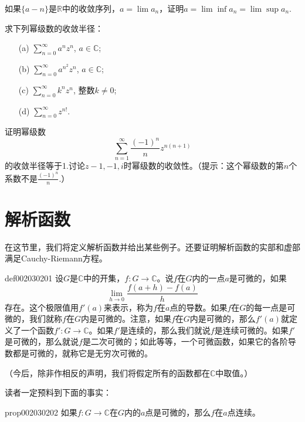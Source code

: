 \begin{exercise}
如果$\{a-n\}$是$\mathbb{R}$中的收敛序列，$a = \lim{a_n}$，证明$a = \lim\inf{a_n} = \lim\sup{a_n}$.
\end{exercise}

\begin{exercise}
求下列幂级数的收敛半径：
\begin{enumerate}
\item[(a)]$\sum\limits_{n=0}^{\infty}{a^nz^n}$, $a \in \mathbb{C}$;
\item[(b)]$\sum\limits_{n=0}^{\infty}{a^{n^2}z^n}$, $a \in \mathbb{C}$;
\item[(c)]$\sum\limits_{n=0}^{\infty}{k^nz^n}$, 整数$k \neq 0$;
\item[(d)]$\sum\limits_{n=0}^{\infty}{z^{n!}}$.
\end{enumerate}
\end{exercise}

\begin{exercise}
证明幂级数
\[
\sum_{n=1}^{\infty}{\frac{(-1)^n}{n}z^{n(n+1)}}
\]
的收敛半径等于1.讨论$z-1,-1, i$时幂级数的收敛性。（提示：这个幂级数的第$n$个系数不是$\frac{(-1)^n}{n}$.）
\end{exercise}

\section{解析函数}\label{section0020302}
在这节里，我们将定义解析函数并给出某些例子。还要证明解析函数的实部和虚部满足Cauchy-Riemann方程。

\begin{definition}{}{def002030201}
设$G$是$\mathbb{C}$中的开集，$f: G \to \mathbb{C}$。说$f$在$G$内的一点$a$是可微的，如果
\[
\lim_{h \to 0}{\frac{f(a+h) - f(a)}{h}}
\]
存在。这个极限值用$f'(a)$来表示，称为$f$在$a$点的导数。如果$f$在$G$的每一点是可微的，我们就称$f$在$G$内是可微的。注意，如果$f$在$G$内是可微的，那么$f'(a)$就定义了一个函数$f':G \to \mathbb{C}$。如果$f'$是连续的，那么我们就说$f$是连续可微的。如果$f'$是可微的，那么就说$f$是二次可微的；如此等等，一个可微函数，如果它的各阶导数都是可微的，就称它是无穷次可微的。
\end{definition}

（今后，除非作相反的声明，我们将假定所有的函数都在$\mathbb{C}$中取值。）

读者一定预料到下面的事实：
\begin{proposition}{}{prop002030202}
如果$f:G \to \mathbb{C}$在$G$内的$a$点是可微的，那么$f$在$a$点连续。
\end{proposition}

